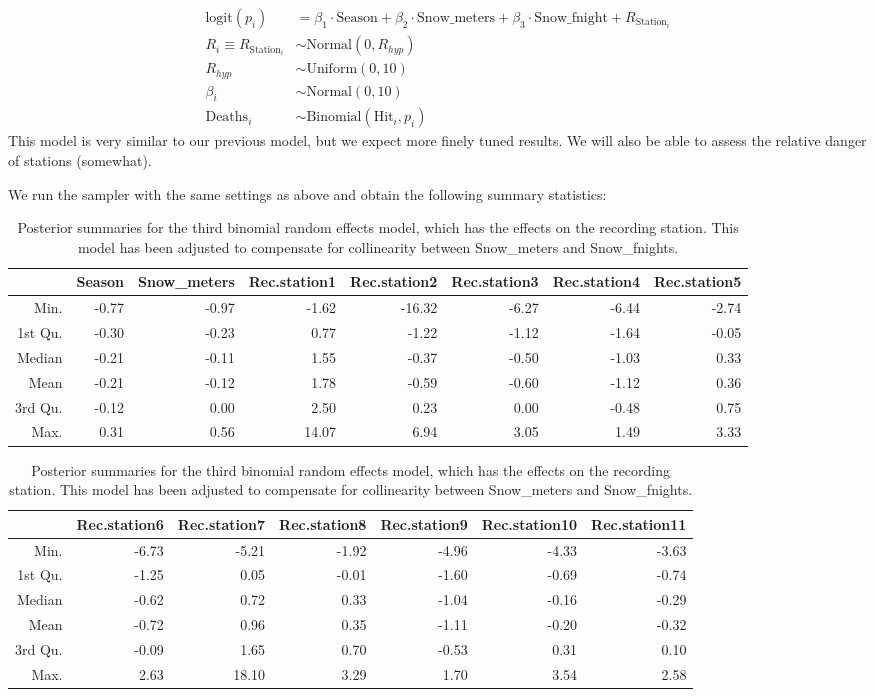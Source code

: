 \documentclass[12pt]{extarticle}
\begin{document}
\begin{align*}
\mathrm{logit}(p_i) &= \beta_1 \cdot \mathrm{Season} + \beta_2 \cdot \mathrm{Snow\_meters} + \beta_3 \cdot \mathrm{Snow\_fnight} + R_{\mathrm{Station}_i}\\
R_i \equiv R_{\mathrm{Station}_i} &\sim \mathrm{Normal}(0, R_{hyp})\\
R_{hyp} &\sim \mathrm{Uniform}(0, 10)\\
\beta_i &\sim \mathrm{Normal}(0, 10)\\
\mathrm{Deaths}_i &\sim \mathrm{Binomial}(\mathrm{Hit}_i, p_i)
\end{align*}
This model is very similar to our previous model, but we expect more finely tuned results. We will also be able to assess the relative danger of stations (somewhat). 

We run the sampler with the same settings as above and obtain the following summary statistics: 

\begin{table}[H]
	\centering
	\footnotesize
	\begin{tabular}{r|rrrrrrr}
		\hline
		& Season & Snow\_meters & Rec.station1 & Rec.station2 & Rec.station3 & Rec.station4 & Rec.station5 \\ 
		\hline
		Min. & -0.77 & -0.97 & -1.62 & -16.32 & -6.27 & -6.44 & -2.74 \\ 
		1st Qu. & -0.30 & -0.23 & 0.77 & -1.22 & -1.12 & -1.64 & -0.05 \\ 
		Median & -0.21 & -0.11 & 1.55 & -0.37 & -0.50 & -1.03 & 0.33 \\ 
		Mean & -0.21 & -0.12 & 1.78 & -0.59 & -0.60 & -1.12 & 0.36 \\ 
		3rd Qu. & -0.12 & 0.00 & 2.50 & 0.23 & 0.00 & -0.48 & 0.75 \\ 
		Max. & 0.31 & 0.56 & 14.07 & 6.94 & 3.05 & 1.49 & 3.33 \\ 
		\hline
	\end{tabular}

\vspace{1em}

	\begin{tabular}{r|rrrrrr}
		\hline
		& Rec.station6 & Rec.station7 & Rec.station8 & Rec.station9 & Rec.station10 & Rec.station11 \\ 
		\hline
		Min. & -6.73 & -5.21 & -1.92 & -4.96 & -4.33 & -3.63 \\ 
		1st Qu. & -1.25 & 0.05 & -0.01 & -1.60 & -0.69 & -0.74 \\ 
		Median & -0.62 & 0.72 & 0.33 & -1.04 & -0.16 & -0.29 \\ 
		Mean & -0.72 & 0.96 & 0.35 & -1.11 & -0.20 & -0.32 \\ 
		3rd Qu. & -0.09 & 1.65 & 0.70 & -0.53 & 0.31 & 0.10 \\ 
		Max. & 2.63 & 18.10 & 3.29 & 1.70 & 3.54 & 2.58 \\ 
		\hline
	\end{tabular}
\caption{Posterior summaries for the third binomial random effects model, which has the effects on the recording station. This model has been adjusted to compensate for collinearity between Snow\_meters and Snow\_fnights.}
\label{tab:postsum_binmod3}
\end{table}
\end{document}
